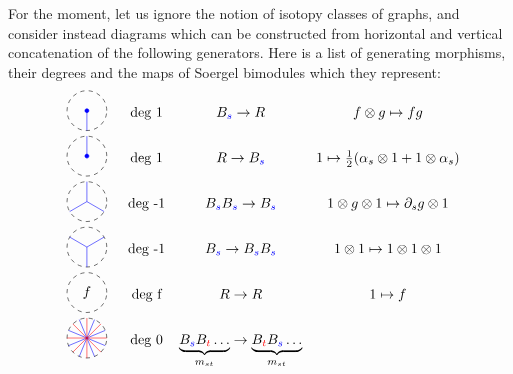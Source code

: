 For the moment, let us ignore the notion of isotopy classes of graphs, and consider instead diagrams which can be constructed from horizontal and vertical concatenation of the following generators. Here is a list of generating morphisms, their degrees and the maps of Soergel bimodules which they represent:
\[
\begin{array}{cccc}
\begin{array}{c}\tikz[scale=0.5]{\draw[dashed] (3,0) circle (1cm);
\draw[color=blue] (3,-1) to (3,0);
\node[circle,fill,draw,inner sep=0mm,minimum size=1mm,color=blue] at (3,0) {};}\end{array}& \text{deg 1} & B_{\color{blue}s} \to R  & f \otimes g \mapsto fg 
\\
\begin{array}{c}\tikz[scale=0.5]{\draw[dashed] (3,0) circle (1cm);
\draw[color=blue] (3,1) to (3,0);
\node[circle,fill,draw,inner sep=0mm,minimum size=1mm,color=blue] at (3,0) {};}\end{array}
& \text{deg 1}&
R \to B_{\color{blue}s}  & 1 \mapsto \frac{1}{2}(\alpha_s \otimes 1 + 1
  \otimes \alpha_s)
\\
\begin{array}{c}\tikz[scale=0.5]{\draw[dashed] (0,0) circle (1cm);
\draw[color=blue] (-30:1cm) -- (0,0) -- (90:1cm);
\draw[color=blue] (-150:1cm) -- (0,0);}\end{array}
&  \text{deg -1} & 
B_{\color{blue}s} B_{\color{blue}s} \to B_{\color{blue}s}  & 1 \otimes g \otimes 1 \mapsto \partial_s g
  \otimes 1
\\

\begin{array}{c}\tikz[scale=0.5]{\draw[dashed] (0,0) circle (1cm);
\draw[color=blue] (30:1cm) -- (0,0) -- (-90:1cm);
\draw[color=blue] (150:1cm) -- (0,0);}\end{array}
&  \text{deg -1} & B_{\color{blue}s} \to B_{\color{blue}s} B_{\color{blue}s}  & 1 \otimes 1 \mapsto 1 \otimes 1
  \otimes 1 \\
\begin{array}{c}\tikz[scale=0.5]{\draw[dashed] (0,0) circle (1cm);
\node at (0,0) {$f$};}\end{array}
&  \text{deg f} &
R \to R  & 1 \mapsto f
\\
\begin{array}{c}\tikz[scale=0.5]{\draw[dashed] (0,0) circle (1cm);
\draw[color=blue] (0,0) -- (22.5:1cm);
\draw[color=blue] (0,0) -- (67.5:1cm);
\draw[color=blue] (0,0) -- (112.5:1cm);
\draw[color=blue] (0,0) -- (157.5:1cm);
\draw[color=blue] (0,0) -- (-22.5:1cm);
\draw[color=blue] (0,0) -- (-67.5:1cm);
\draw[color=blue] (0,0) -- (-112.5:1cm);
\draw[color=blue] (0,0) -- (-157.5:1cm);
\draw[color=red] (0,0) -- (0:1cm);
\draw[color=red] (0,0) -- (45:1cm);
\draw[color=red] (0,0) -- (90:1cm);
\draw[color=red] (0,0) -- (135:1cm);
\draw[color=red] (0,0) -- (180:1cm);
\draw[color=red] (0,0) -- (-45:1cm);
\draw[color=red] (0,0) -- (-90:1cm);
\draw[color=red] (0,0) -- (-135:1cm);
}\end{array}
&  \text{deg 0}&  \ubr{B_{\color{blue}s}B_{\color{red}t} \dots }{m_{st}}  \to \ubr{B_{\color{red}t} B_{\color{blue}s} \dots }{m_{st}}    & 
\end{array}
\]
